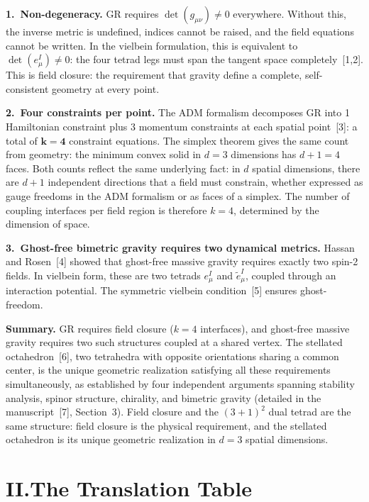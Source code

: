 \documentclass[11pt]{article}
\begin{document}
\textbf{1.\ Non-degeneracy.}\quad
GR requires $\det(g_{\mu\nu}) \neq 0$ everywhere.
Without this, the inverse metric is undefined, indices cannot be raised, and the field equations cannot be written.
In the vielbein formulation, this is equivalent to $\det(e^I_\mu) \neq 0$: the four tetrad legs must span the tangent space completely~[1,2].
This is field closure: the requirement that gravity define a complete, self-consistent geometry at every point.

\textbf{2.\ Four constraints per point.}\quad
The ADM formalism decomposes GR into 1 Hamiltonian constraint plus 3 momentum constraints at each spatial point~[3]: a total of $\mathbf{k = 4}$ constraint equations.
The simplex theorem gives the same count from geometry: the minimum convex solid in $d = 3$ dimensions has $d + 1 = 4$ faces.
Both counts reflect the same underlying fact: in $d$ spatial dimensions, there are $d + 1$ independent directions that a field must constrain, whether expressed as gauge freedoms in the ADM formalism or as faces of a simplex.
The number of coupling interfaces per field region is therefore $k = 4$, determined by the dimension of space.

\textbf{3.\ Ghost-free bimetric gravity requires two dynamical metrics.}\quad
Hassan and Rosen~[4] showed that ghost-free massive gravity requires exactly two spin-2 fields.
In vielbein form, these are two tetrads $e^I_\mu$ and $\tilde{e}^I_\mu$, coupled through an interaction potential.
The symmetric vielbein condition~[5] ensures ghost-freedom.

\textbf{Summary.}\quad
GR requires field closure ($k = 4$ interfaces), and ghost-free massive gravity requires two such structures coupled at a shared vertex.
The stellated octahedron~[6], two tetrahedra with opposite orientations sharing a common center, is the unique geometric realization satisfying all these requirements simultaneously, as established by four independent arguments spanning stability analysis, spinor structure, chirality, and bimetric gravity (detailed in the manuscript~[7], Section~3).
Field closure and the $(3+1)^2$ dual tetrad are the same structure: field closure is the physical requirement, and the stellated octahedron is its unique geometric realization in $d = 3$ spatial dimensions.

\section*{II.\quad The Translation Table}
\end{document}
